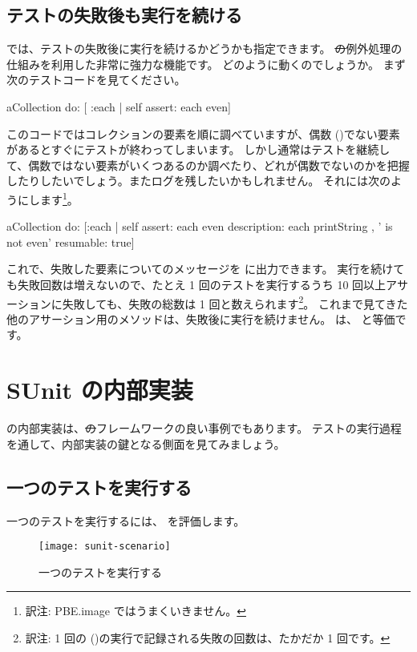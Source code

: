 \documentclass[a4paper,10pt,twoside]{book}
\begin{document}
\subsection{テストの失敗後も実行を続ける}
\sunit では、テストの失敗後に実行を続けるかどうかも指定できます。
\st の例外処理の仕組みを利用した非常に強力な機能です。
どのように動くのでしょうか。
まず次のテストコードを見てください。
\begin{code}{}
aCollection do: [ :each | self assert: each even]
\end{code}
このコードではコレクションの要素を順に調べていますが、偶数 ()でない要素があるとすぐにテストが終わってしまいます。
しかし通常はテストを継続して、偶数ではない要素がいくつあるのか調べたり、どれが偶数でないのかを把握したりしたいでしょう。またログを残したいかもしれません。
それには次のようにします\footnote{訳注: PBE.image ではうまくいきません。}。
\begin{code}{}
aCollection do:
	[:each |
	self
		assert: each even
		description: each printString , ' is not even'
		resumable: true]
\end{code}
これで、失敗した要素についてのメッセージを  に出力できます。
実行を続けても失敗回数は増えないので、たとえ 1 回のテストを実行するうち 10 回以上アサーションに失敗しても、失敗の総数は 1 回と数えられます\footnote{訳注: 1 回の  ()の実行で記録される失敗の回数は、たかだか 1 回です。}。
これまで見てきた他のアサーション用のメソッドは、失敗後に実行を続けません。
 は、 と等価です。
\section{SUnit の内部実装}

\sunit の内部実装は、\st のフレームワークの良い事例でもあります。
テストの実行過程を通して、内部実装の鍵となる側面を見てみましょう。
\subsection{一つのテストを実行する}

一つのテストを実行するには、 を評価します。

\begin{figure}[tbh]
  \begin{center}
		{\texttt{[image: sunit-scenario]}}
	\caption{一つのテストを実行する}
  \end{center}
\end{figure}
\end{document}
